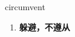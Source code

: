 
\begin{frame}
{\huge circumvent}
\begin{center}
\begin{enumerate}\Large
  \item \textbf{躲避，不遵从}
\end{enumerate}
\end{center}
\end{frame}
